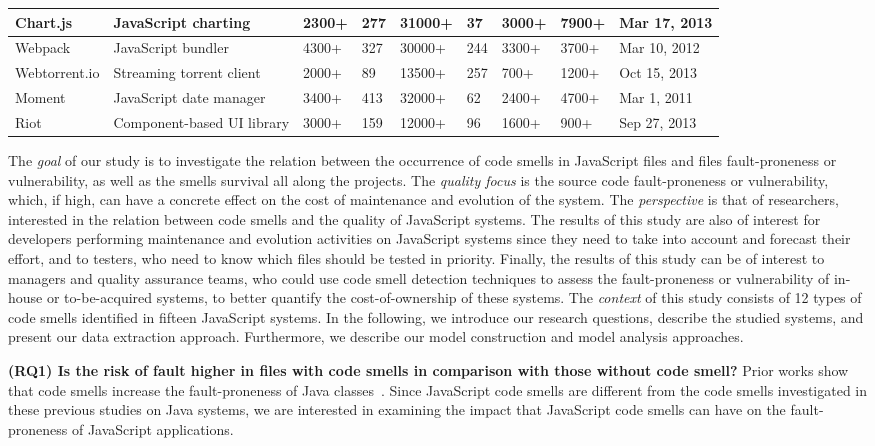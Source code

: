 \begin{table*}[!htbp]
{\begin{tabular}{l|m{2cm}|m{1.2cm}|m{1.3cm}|m{1.4cm}|l|m{1.3cm}|l|m{2cm}}
Chart.js	 & JavaScript charting		& 2300+ 	 & 277			   & 31000+			 & 37		   & 3000+			  & 7900+	 & Mar 17, 2013		   \\ \hline
Webpack	 & JavaScript bundler		& 4300+		 & 327			   & 30000+			 & 244 		   & 3300+			  & 3700+	 & Mar 10, 2012 		   \\ \hline
Webtorrent.io & Streaming torrent client & 2000+	 & 89			   & 13500+			 & 257		   & 700+			  & 1200+	 & Oct 15, 2013		   \\ \hline
Moment	 & JavaScript date manager  & 3400+		 & 413			   & 32000+			 & 62		   & 2400+			  & 4700+ 	 & Mar 1, 2011			   \\ \hline
Riot	 & Component-based UI library & 3000+ 	 & 159			   & 12000+			 & 96 		   & 1600+			  & 900+	 & Sep 27, 2013		   \\ \hline
\end{tabular}
}
\vspace{-15pt}
\end{table*}

The \emph{goal} of our study is to investigate the relation between the occurrence of code smells in JavaScript files and files fault-proneness or vulnerability, as well as the smells survival all along the projects. The \emph{quality focus} is the source code fault-proneness {\color{blue}or vulnerability}, which, if high, can have a concrete effect on the cost of maintenance and evolution of the system. The \emph{perspective} is that of researchers, interested in the relation between code smells and the quality of JavaScript systems. The results of this study are also of interest for developers performing maintenance and evolution activities on JavaScript systems since they need to take
into account and forecast their effort, and to testers, who need to know which files should be tested in priority. Finally, the results of this study can be of interest to managers and quality assurance teams, who could use code smell detection techniques to assess the fault-proneness {\color{blue}or vulnerability} of in-house or to-be-acquired systems, to better quantify
the cost-of-ownership of these systems. The \emph{context} of this study consists of 12 types of code smells identified in {\color{blue}fifteen} JavaScript systems. In the following, we introduce our research questions, describe the studied systems, and present our data extraction approach. Furthermore, we describe our model construction and model analysis approaches.

\textbf{(RQ1) Is the risk of fault higher in files with code smells in comparison with those without code smell?}
Prior works show that code smells increase the fault-proneness of Java classes~\cite{Khomh2012,jaafar2013mining}. Since JavaScript code smells are different from the code smells investigated in these previous studies on Java systems, we are interested in examining the impact that JavaScript code smells can have on the fault-proneness of JavaScript applications.

